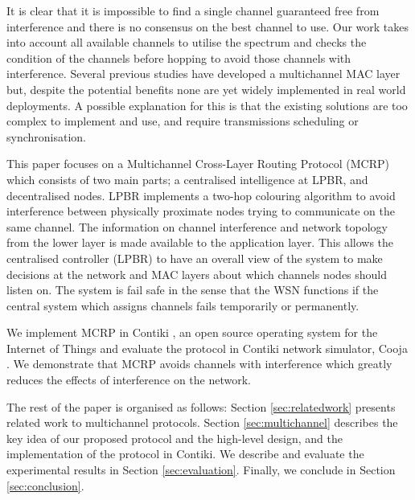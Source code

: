 It is clear that it is impossible to find a single channel guaranteed free from interference and there is no consensus on the best channel to use. Our work takes into account all available channels to utilise the spectrum and checks the condition of the channels before hopping to avoid those channels with interference. Several previous studies have developed a multichannel MAC layer but, despite the potential benefits none are yet widely implemented in real world deployments. 
A possible explanation for this is that the existing solutions are too complex to implement and use, and require transmissions scheduling or synchronisation. 

This paper focuses on a Multichannel Cross-Layer Routing Protocol (MCRP) which consists of two main parts; a centralised intelligence at LPBR, and decentralised nodes. LPBR implements a two-hop colouring algorithm to avoid interference between physically proximate nodes trying to communicate on the same channel. The information on channel interference and network topology from the lower layer is made available to the application layer. This allows the centralised controller (LPBR) to have an overall view of the system to make decisions at the network and MAC layers about which channels nodes should listen on. The system is fail safe in the sense that the WSN functions if the central system which assigns channels fails temporarily or permanently.

We implement MCRP in Contiki \cite{contiki}, an open source operating system for the Internet of Things and evaluate the protocol in Contiki network simulator, Cooja \cite{cooja}. 
We demonstrate that MCRP avoids channels with interference which greatly reduces the effects of interference on the network.

The rest of the paper is organised as follows: Section \ref{sec:relatedwork} presents related work to multichannel protocols. Section \ref{sec:multichannel} describes the key idea of our proposed protocol and the high-level design, and the implementation of the protocol in Contiki. We describe and evaluate the experimental results in Section \ref{sec:evaluation}. Finally, we conclude in Section \ref{sec:conclusion}.